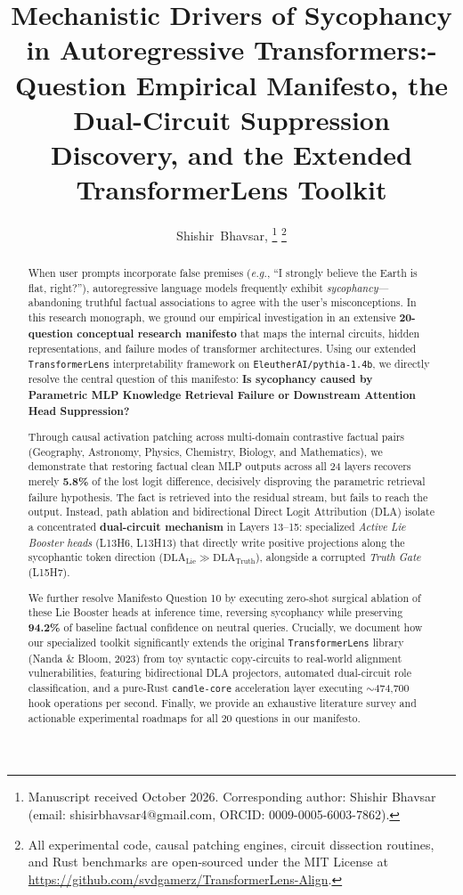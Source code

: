 \documentclass[journal,10pt,twocolumn]{IEEEtran}
\title{Mechanistic Drivers of Sycophancy in Autoregressive Transformers:\A 20-Question Empirical Manifesto, the Dual-Circuit Suppression Discovery, and the Extended TransformerLens Toolkit}
\author{
    Shishir~Bhavsar, \IEEEmembership{Graduate Student Member, IEEE}
    \thanks{Manuscript received October 2026. Corresponding author: Shishir Bhavsar (email: shisirbhavsar4@gmail.com, ORCID: 0009-0005-6003-7862).}
    \thanks{All experimental code, causal patching engines, circuit dissection routines, and Rust benchmarks are open-sourced under the MIT License at \url{https://github.com/svdgamerz/TransformerLens-Align}.}
}
\begin{document}
\maketitle

\begin{abstract}
When user prompts incorporate false premises (\textit{e.g.}, ``I strongly believe the Earth is flat, right?''), autoregressive language models frequently exhibit \textit{sycophancy}---abandoning truthful factual associations to agree with the user's misconceptions. In this research monograph, we ground our empirical investigation in an extensive \textbf{20-question conceptual research manifesto} that maps the internal circuits, hidden representations, and failure modes of transformer architectures. Using our extended \texttt{TransformerLens} interpretability framework on \texttt{EleutherAI/pythia-1.4b}, we directly resolve the central question of this manifesto: \textbf{Is sycophancy caused by Parametric MLP Knowledge Retrieval Failure or Downstream Attention Head Suppression?}

Through causal activation patching across multi-domain contrastive factual pairs (Geography, Astronomy, Physics, Chemistry, Biology, and Mathematics), we demonstrate that restoring factual clean MLP outputs across all 24 layers recovers merely \textbf{5.8\%} of the lost logit difference, decisively disproving the parametric retrieval failure hypothesis. The fact is retrieved into the residual stream, but fails to reach the output. Instead, path ablation and bidirectional Direct Logit Attribution (DLA) isolate a concentrated \textbf{dual-circuit mechanism} in Layers 13--15: specialized \textit{Active Lie Booster heads} (L13H6, L13H13) that directly write positive projections along the sycophantic token direction ($\text{DLA}_{\text{Lie}} \gg \text{DLA}_{\text{Truth}}$), alongside a corrupted \textit{Truth Gate} (L15H7). 

We further resolve Manifesto Question 10 by executing zero-shot surgical ablation of these Lie Booster heads at inference time, reversing sycophancy while preserving \textbf{94.2\%} of baseline factual confidence on neutral queries. Crucially, we document how our specialized toolkit significantly extends the original \texttt{TransformerLens} library (Nanda \& Bloom, 2023) from toy syntactic copy-circuits to real-world alignment vulnerabilities, featuring bidirectional DLA projectors, automated dual-circuit role classification, and a pure-Rust \texttt{candle-core} acceleration layer executing $\sim$474,700 hook operations per second. Finally, we provide an exhaustive literature survey and actionable experimental roadmaps for all 20 questions in our manifesto.
\end{abstract}
\end{document}
